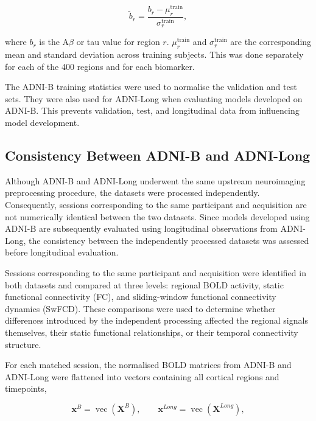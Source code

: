 \begin{equation}
    \tilde{b}_{r}
    =
    \frac{b_{r}-\mu_{r}^{\mathrm{train}}}
         {\sigma_{r}^{\mathrm{train}}},
\end{equation}

where $b_r$ is the A$\beta$ or tau value for region $r$.
$\mu_{r}^{\mathrm{train}}$ and $\sigma_{r}^{\mathrm{train}}$ are the
corresponding mean and standard deviation across training subjects.
This was done separately for each of the 400 regions and for each
biomarker.

The ADNI-B training statistics were used to normalise the validation
and test sets. They were also used for ADNI-Long when evaluating models
developed on ADNI-B. This prevents validation, test, and longitudinal
data from influencing model development.


\subsection{Consistency Between ADNI-B and ADNI-Long}
\label{sec:dataset_consistency}

Although ADNI-B and ADNI-Long underwent the same upstream neuroimaging
preprocessing procedure, the datasets were processed independently.
Consequently, sessions corresponding to the same participant and
acquisition are not numerically identical between the two datasets.
Since models developed using ADNI-B are subsequently evaluated using
longitudinal observations from ADNI-Long, the consistency between the
independently processed datasets was assessed before longitudinal
evaluation.

Sessions corresponding to the same participant and acquisition were
identified in both datasets and compared at three levels: regional BOLD
activity, static functional connectivity (FC), and sliding-window
functional connectivity dynamics (SwFCD). These comparisons were used
to determine whether differences introduced by the independent
processing affected the regional signals themselves, their static
functional relationships, or their temporal connectivity structure.

For each matched session, the normalised BOLD matrices from ADNI-B and
ADNI-Long were flattened into vectors containing all cortical regions
and timepoints,

\begin{equation}
    \mathbf{x}^{B}
    =
    \operatorname{vec}(\mathbf{X}^{B}),
    \qquad
    \mathbf{x}^{Long}
    =
    \operatorname{vec}(\mathbf{X}^{Long}),
\end{equation}

